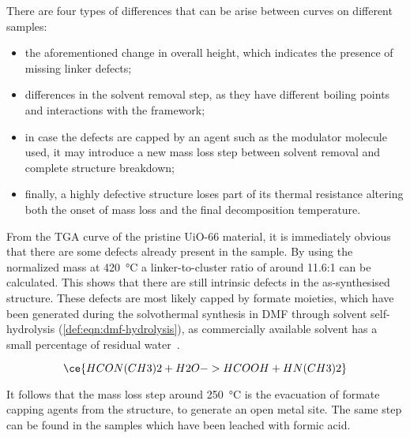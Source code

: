 There are four types of differences that can be arise 
between curves on different samples:

\begin{itemize}
    \item the aforementioned change in overall height,
    which indicates the presence of missing linker defects;
    \item differences in the solvent removal step, as they
    have different boiling points and interactions with the 
    framework;
    \item in case the defects are capped by an agent such as 
    the modulator molecule used, it may introduce a new 
    mass loss step between solvent removal and complete
    structure breakdown;
    \item finally, a highly defective structure loses part 
    of its thermal resistance altering both the onset of mass
    loss and the final decomposition temperature.
\end{itemize}

From the TGA curve of the pristine UiO-66 material, 
it is immediately obvious that there are some defects 
already present in the sample. By using the normalized
mass at \SI{420}{\degreeCelsius} a linker-to-cluster 
ratio of around 11.6:1 can be calculated. This shows that
there are still intrinsic defects in the as-synthesised 
structure. These defects are most likely capped by 
formate moieties, which have been generated during 
the solvothermal synthesis in DMF through solvent 
self-hydrolysis (\autoref{def:eqn:dmf-hydrolysis}), as 
commercially available solvent has a small percentage of 
residual water~\cite{shearerDefectEngineeringTuning2016}.

\begin{equation}\label{def:eqn:dmf-hydrolysis}
    \ce{HCON(CH3)2 + H2O -> HCOOH + HN(CH3)2}
\end{equation}

It follows that the mass loss step around \SI{250}{\degreeCelsius}
is the evacuation of formate capping agents from the 
structure, to generate an open metal site. The same step
can be found in the samples which have been leached with
formic acid.

